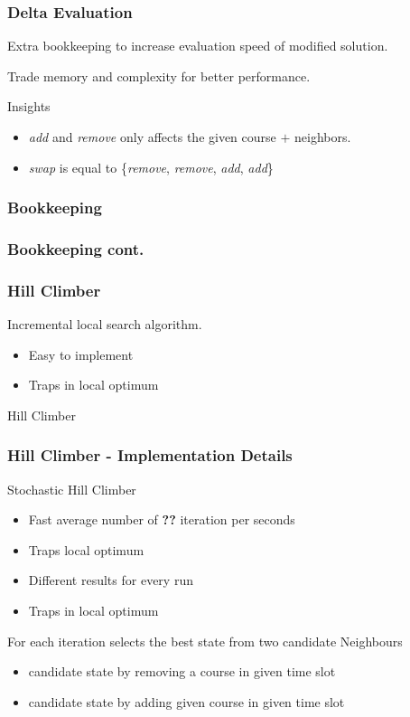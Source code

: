 \documentclass{beamer}
\makeatletter
\newenvironment{algorithm}[1][]{%
  \def\@captype{algorithm}%
  \par\nobreak\begin{center}\nobreak}
  {\par\nobreak\end{center}\nobreak}
\newcounter{algorithm}
\makeatother
\begin{document}
\begin{frame}
	\frametitle{Delta Evaluation}
	Extra bookkeeping to increase evaluation speed of modified solution.
	
	Trade memory and complexity for better performance.
	
	\begin{block}{Insights}
		\begin{itemize}
			\item \emph{add} and \emph{remove} only affects the given course $+$ neighbors.
			\item \emph{swap} is equal to \{\emph{remove}, \emph{remove}, \emph{add}, \emph{add}\}
		\end{itemize}	
	\end{block}
	
\end{frame}

\begin{frame}
	\frametitle{Bookkeeping}
	\lstI
\end{frame}

\begin{frame}
	\frametitle{Bookkeeping cont.}
	\lstII
\end{frame}



\begin{frame}
\frametitle{Hill Climber}
Incremental local search algorithm. 
\begin{itemize}
\item Easy to implement
\item Traps in local optimum
\end{itemize}
\begin{algorithm}[H]
\begin{algorithmic}[1]
\REPEAT
{}
\ENDIF
{}
\end{algorithmic}
\caption{Hill Climber }
\label{alg:seq}
\end{algorithm}
\end{frame}

\begin{frame}
\frametitle{Hill Climber - Implementation Details}
Stochastic Hill Climber
\begin{itemize}
\item Fast average number of \textbf{??} iteration per seconds
\item Traps local optimum 
\item Different results for every run
\item Traps in local optimum
\end{itemize}
For each iteration selects the best state from two candidate Neighbours
\begin{itemize}
\item candidate state by removing a course in given time slot
\item candidate state by adding given  course in given time slot
\end{itemize}
\end{frame}
\end{document}
